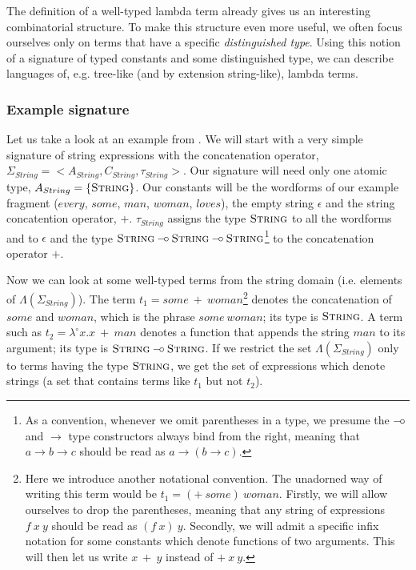 \documentclass{article}
\def\limp {\mathbin{{-}\mkern-3.5mu{\circ}}}
\begin{document}
The definition of a well-typed lambda term already gives us an
interesting combinatorial structure. To make this structure even more
useful, we often focus ourselves only on terms that have a specific
\emph{distinguished type}. Using this notion of a signature of typed
constants and some distinguished type, we can describe languages of,
e.g. tree-like (and by extension string-like), lambda terms.

\subsubsection{Example signature}
\label{sssec:example-sig}

Let us take a look at an example from
\cite{pogodalla2007generalizing}. We will start with a very simple
signature of string expressions with the concatenation operator,
$\Sigma_{String} = \mathopen{<}A_{String}, C_{String},
\tau_{String}\mathclose{>}$. Our signature will need only one atomic
type, $A_{String} = \{\textsc{String}\}$. Our constants will be the
wordforms of our example fragment ($every$, $some$, $man$, $woman$,
$loves$), the empty string $\epsilon$ and the string concatention
operator, $+$. $\tau_{String}$ assigns the type $\textsc{String}$ to all
the wordforms and to $\epsilon$ and the type $\textsc{String} \limp
\textsc{String} \limp \textsc{String}$\footnote{As a convention,
  whenever we omit parentheses in a type, we presume the $\limp$ and
  $\to$ type constructors always bind from the right, meaning that $a
  \to b \to c$ should be read as $a \to (b \to c)$.}
to the concatenation operator $+$.

Now we can look at some well-typed terms from the string domain
(i.e. elements of $\Lambda(\Sigma_{String})$). The term $t_1 =
some\ +\ woman$\footnote{Here we introduce another notational
  convention. The unadorned way of writing this term would be $t_1 =
  (+\ some)\ woman$. Firstly, we will allow ourselves to drop the
  parentheses, meaning that any string of expressions $f\ x\ y$ should
  be read as $(f\ x)\ y$. Secondly, we will admit a specific infix
  notation for some constants which denote functions of two
  arguments. This will then let us write $x\ +\ y$ instead of
  $+\ x\ y$.} denotes the concatenation of $some$ and $woman$, which is
the phrase $some\ woman$; its type is $\textsc{String}$. A term such as
$t_2 = \lambda^{\circ} x. x\ +\ man$ denotes a function that appends the
string $man$ to its argument; its type is $\textsc{String} \limp
\textsc{String}$. If we restrict the set $\Lambda(\Sigma_{String})$ only
to terms having the type $\textsc{String}$, we get the set of
expressions which denote strings (a set that contains terms like $t_1$
but not $t_2$).
\end{document}
